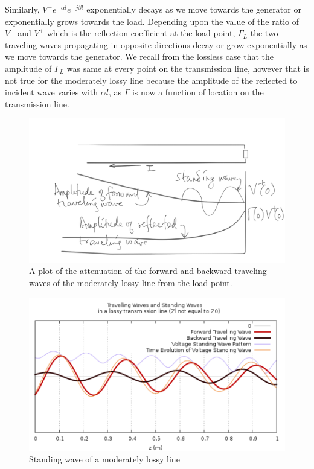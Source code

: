 Similarly, $V^-e^{-\alpha l}e^{-j\beta l}$ exponentially decays as we move towards the generator or exponentially grows towards the load. Depending upon the value of the ratio of $V^-$ and $V^+$ which is the reflection coefficient at the load point, $\Gamma_L$ the two traveling waves propagating in opposite directions decay or grow exponentially as we move towards the generator. We recall from the lossless case that the amplitude of $\Gamma_L$ was same at every point on the transmission line, however that is not true for the moderately lossy line because the amplitude of the reflected to incident wave varies with $\alpha l$, as $\Gamma$ is now a function of location on the transmission line.
\begin{figure}[h]
\centering
\includegraphics[width=1\linewidth]{"./graphics/lossy_standing_wave_temp"}
\caption{A plot of the attenuation of the forward and backward traveling waves of the moderately lossy line from the load point.}
\end{figure}
\begin{figure}[h]
\centering
\includegraphics[width=1\linewidth]{./graphics/plot}
\caption{Standing wave of a moderately lossy line}
\end{figure}


